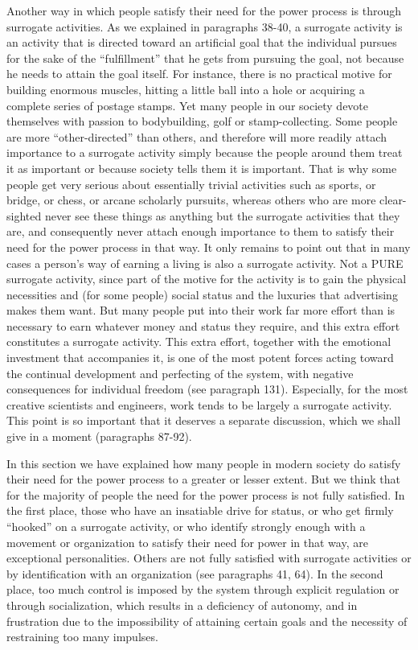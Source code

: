  Another way in which people satisfy their need for the power process is through surrogate activities. As we explained in paragraphs 38-40, a surrogate activity is an activity that is directed toward an artificial goal that the individual pursues for the sake of the “fulfillment” that he gets from pursuing the goal, not because he needs to attain the goal itself. For instance, there is no practical motive for building enormous muscles, hitting a little ball into a hole or acquiring a complete series of postage stamps. Yet many people in our society devote themselves with passion to bodybuilding, golf or stamp-collecting. Some people are more “other-directed” than others, and therefore will more readily attach importance to a surrogate activity simply because the people around them treat it as important or because society tells them it is important. That is why some people get very serious about essentially trivial activities such as sports, or bridge, or chess, or arcane scholarly pursuits, whereas others who are more clear-sighted never see these things as anything but the surrogate activities that they are, and consequently never attach enough importance to them to satisfy their need for the power process in that way. It only remains to point out that in many cases a person’s way of earning a living is also a surrogate activity. Not a PURE surrogate activity, since part of the motive for the activity is to gain the physical necessities and (for some people) social status and the luxuries that advertising makes them want. But many people put into their work far more effort than is necessary to earn whatever money and status they require, and this extra effort constitutes a surrogate activity. This extra effort, together with the emotional investment that accompanies it, is one of the most potent forces acting toward the continual development and perfecting of the system, with negative consequences for individual freedom (see paragraph 131). Especially, for the most creative scientists and engineers, work tends to be largely a surrogate activity. This point is so important that it deserves a separate discussion, which we shall give in a moment (paragraphs 87-92).

 In this section we have explained how many people in modern society do satisfy their need for the power process to a greater or lesser extent. But we think that for the majority of people the need for the power process is not fully satisfied. In the first place, those who have an insatiable drive for status, or who get firmly “hooked” on a surrogate activity, or who identify strongly enough with a movement or organization to satisfy their need for power in that way, are exceptional personalities. Others are not fully satisfied with surrogate activities or by identification with an organization (see paragraphs 41, 64). In the second place, too much control is imposed by the system through explicit regulation or through socialization, which results in a deficiency of autonomy, and in frustration due to the impossibility of attaining certain goals and the necessity of restraining too many impulses.

